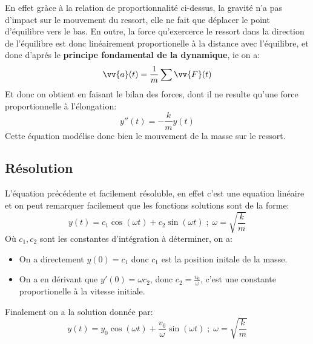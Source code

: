 \documentclass{report}
\begin{document}
      \begin{center}
      \end{center}
      \pagebreak
      En effet gràce à la relation de proportionnalité ci-dessus, la gravité n'a pas d'impact sur le mouvement du ressort, elle ne fait que déplacer le point d'équilibre vers le bas. En outre, la        force qu'exercerce le ressort dans la direction de l'équilibre est donc linéairement proportionelle à la distance avec l'équilibre, et donc d'aprés le \textbf{principe fondamental de la dynamique}, ie on a:
      \[
         \vv{a}(t) = \frac{1}{m}\sum \vv{F}(t)
      \]
      Et donc on obtient en faisant le bilan des forces, dont il ne resulte qu'une force proportionnelle à l'élongation:
      \[
         \boxed{y''(t) = -\frac{k}{m}y(t)}
      \]
      Cette équation modélise donc bien le mouvement de la masse sur le ressort.
      \subsection{Résolution}
         L'équation précédente et facilement résoluble, en effet c'est une equation linéaire et on peut remarquer facilement que les fonctions solutions sont de la forme:
         \[
            y(t) = c_1\cos(\omega t) + c_2\sin(\omega t) \; ; \; \omega = \sqrt{\frac{k}{m}}
         \]
         Où \(c_1, c_2\) sont les constantes d'intégration à déterminer, on a:
         \begin{itemize}
            \item On a directement \(y(0) = c_1\) donc \(c_1\) est la position initale de la masse.
            \item On a en dérivant que \(y'(0) = \omega c_2\), donc \(c_2 = \frac{v_0}{\omega}\), c'est une constante proportionelle à la vitesse initiale.
         \end{itemize}
         Finalement on a la solution donnée par:
         \[
            \boxed{y(t) = y_0\cos(\omega t) + \frac{v_0}{\omega}\sin(\omega t) \; ; \; \omega = \sqrt{\frac{k}{m}}}
         \]
\end{document}
